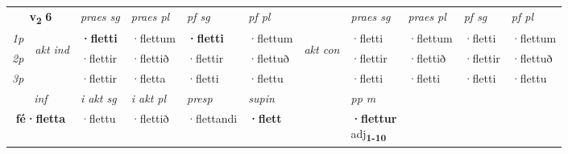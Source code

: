 \noindent
\begin{tabular}{lllllllllll} \toprule
\multicolumn{2}{c}{\textbf{v{\textsubscript{2}}} \Large{\textbf{6}}}  &  \textit{praes sg}  & \textit{praes pl}  &\textit{ pf sg} & \textit{pf pl} &  &  \textit{praes sg}  & \textit{praes pl}  & \textit{pf sg} & \textit{pf pl } \\*
	\cmidrule{3-6} \cmidrule{8-11}
 {\textit{1p}} & \multirow{3}{*}{\begin{turn}{90}\textit{akt ind}\end{turn}} & \textbf{·fletti} & ·flettum & \textbf{·fletti} & ·flettum & \multirow{3}{*}{\begin{turn}{90}\textit{akt con}\end{turn}} &·fletti & ·flettum & ·fletti & ·flettum\\*
 {\textit{2p}} &  &  ·flettir  & ·flettið & ·flettir & ·flettuð & & ·flettir & ·flettið & ·flettir & ·flettuð \\*
{\textit{3p}} &  & ·flettir & ·fletta & ·fletti & ·flettu & & ·fletti & ·fletti& ·fletti & ·flettu \\*
\cmidrule{3-6} \cmidrule{8-11}

   \multicolumn{2}{c}{\textit{inf}}  & \textit{i akt sg} & \textit{i akt pl}   & \textit{presp} & \textit{supin}  && \textit{pp m} \\*
  \multicolumn{2}{c}{\textbf{fé\allowbreak ·fletta}} & ·flettu  & ·flettið   & ·flettandi &  \textbf{·flett}  && \specialcell{\textbf{·flettur} \\ adj\textbf{\textsubscript{1-10}}} \\*
\end{tabular}

